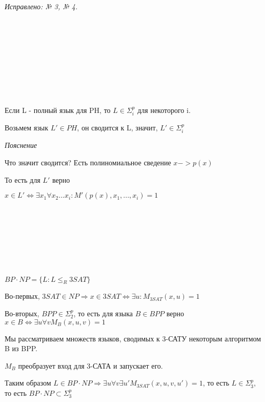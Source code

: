 
\textit{Исправлено: № 3, № 4.}

~\

~\

~\

\begin{problem}{1}

\end{problem}

~\

~\

\begin{solution}

Если L - полный язык для PH, то $L \in \Sigma_i^p$ для некоторого i.

Возьмем язык $L' \in PH$, он сводится к L, значит, $L' \in \Sigma_i^p$

\textit{Пояснение}

Что значит сводится? Есть полиномиальное сведение $x -> p(x)$

То есть для $L'$ верно

$x \in L' \Leftrightarrow \exists x_1 \forall x_2 ... x_i : M'(p(x), x_1, ..., x_i) = 1$

\end{solution}

~\

~\

\begin{problem}{2}


\end{problem}

~\

~\

\begin{solution}

$BP \cdot NP = \{L : L \leqslant_R 3SAT\}$

Во-первых, $3SAT \in NP \Rightarrow x \in 3SAT \Leftrightarrow \exists u : M_{3SAT}(x, u) = 1$

Во-вторых, $BPP \in \Sigma_2^p$, то есть для языка $B \in BPP$ верно $x \in B \Leftrightarrow \exists u \forall v M_B(x, u, v) = 1$

Мы рассматриваем множеств языков, сводимых к 3-САТУ некоторым алгоритмом B из BPP.

$M_B$ преобразует вход для 3-САТА и запускает его.

Таким образом $L \in BP \cdot NP \Rightarrow \exists u \forall v \exists u' M_{3SAT}(x, u, v, u') = 1$, то есть $L \in \Sigma_3^p$, то есть $BP \cdot NP \subset \Sigma_3^p$

\end{solution}

